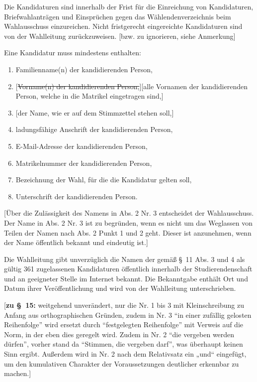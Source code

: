\documentclass[%
draft,%
multilinesections%
]{fswo}
\newcommand\oldT[1]  {{\color{Gray}[\st{#1}]}}
\newcommand\newT[1]  {{\color{Green}[#1]}}
\newcommand\bemFr[1] {{\color{Red}[#1]}}
\newcommand\oldT[1]{}%
\newcommand\newT[1]{#1}
\newcommand\bemFr[1]{}%
\newcommand\change[2]{\oldT{#1}\newT{#2}}
\begin{document}
\begin{contract}
Die Kandidaturen sind innerhalb der Frist für die Einreichung von Kandidaturen, Briefwahlanträgen und Einsprüchen gegen das Wählendenverzeichnis beim Wahlausschuss einzureichen.
Nicht fristgerecht eingereichte Kandidaturen sind von der Wahlleitung zurückzuweisen.
\bemFr{bzw. zu ignorieren, siehe Anmerkung}

Eine Kandidatur muss mindestens enthalten:
\begin{enumerate}
\item Familienname(n) der kandidierenden Person,
\item \change{Vorname(n) der kandidierenden Person,}{alle Vornamen der kandidierenden Person, welche in die Matrikel eingetragen sind,}
\item \newT{der Name, wie er auf dem Stimmzettel stehen soll,}
\item ladungsfähige Anschrift der kandidierenden Person,
\item E-Mail-Adresse der kandidierenden Person,
\item Matrikelnummer der kandidierenden Person,
\item Bezeichnung der Wahl, für die die Kandidatur gelten soll,
\item Unterschrift der kandidierenden Person.
\end{enumerate}

\newT{Über die Zulässigkeit des Namens in Abs. 2 Nr. 3 entscheidet der Wahlausschuss.
Der Name in Abs. 2 Nr. 3 ist zu begründen, wenn es nicht um das Weglassen von Teilen der Namen nach Abs. 2 Punkt 1 und 2 geht.
Dieser ist anzunehmen, wenn der Name öffentlich bekannt und eindeutig ist.}

Die Wahlleitung gibt unverzüglich die Namen der gemäß \S~11 Abs. 3 und 4 als gültig 361 zugelassenen Kandidaturen öffentlich innerhalb der Studierendenschaft und an geeigneter Stelle im Internet bekannt.
Die Bekanntgabe enthält Ort und Datum ihrer Veröffentlichung und wird von der Wahlleitung unterschrieben.
\end{contract}

\bemFr{\textbf{zu \S~15:}
weitgehend unverändert, nur die Nr. 1 bis 3 mit Kleinschreibung zu Anfang aus orthographischen Gründen,
zudem in Nr. 3 \enquote{in einer zufällig gelosten Reihenfolge} wird ersetzt durch \enquote{festgelegten Reihenfolge} mit Verweis auf die Norm,
in der eben dies geregelt wird. Zudem in Nr. 2 \enquote{die vergeben werden dürfen}, vorher stand da \enquote{Stimmen, die vergeben darf}, was überhaupt keinen Sinn ergibt.
Außerdem wird in Nr. 2 nach dem Relativsatz ein „und“ eingefügt, um den kumulativen Charakter der Voraussetzungen deutlicher erkennbar zu machen.}
\end{document}

